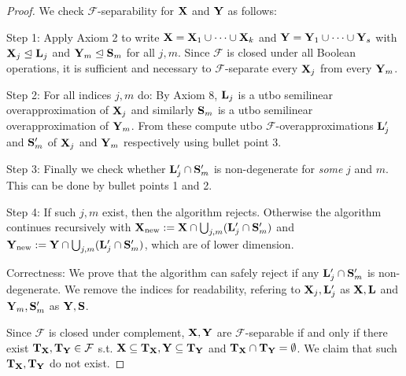 \begin{proof}
We check \(\mathcal{F}\)-separability for \(\mathbf{X}\) and \(\mathbf{Y}\) as follows:

Step 1:  Apply Axiom 2 to write \(\mathbf{X}=\mathbf{X}_1 \cup \dots \cup \mathbf{X}_k\) and \(\mathbf{Y}=\mathbf{Y}_1 \cup \dots \cup \mathbf{Y}_s\) with \(\mathbf{X}_j \trianglelefteq \mathbf{L}_j\) and \(\mathbf{Y}_m \trianglelefteq \mathbf{S}_m\) for all \(j,m\). Since \(\mathcal{F}\) is closed under all Boolean operations, it is sufficient and necessary to \(\mathcal{F}\)-separate every \(\mathbf{X}_j\) from every \(\mathbf{Y}_m\). 

Step 2: For all indices \(j,m\) do: By Axiom 8, \(\mathbf{L}_j\) is a utbo semilinear overapproximation of \(\mathbf{X}_j\) and similarly \(\mathbf{S}_m\) is a utbo semilinear overapproximation of \(\mathbf{Y}_m\). From these compute utbo \(\mathcal{F}\)-overapproximations \(\mathbf{L}_j'\) and \(\mathbf{S}_m'\) of \(\mathbf{X}_j\) and \(\mathbf{Y}_m\) respectively using bullet point 3.

Step 3: Finally we check whether \(\mathbf{L}_j' \cap \mathbf{S}_m'\) is non-degenerate for \emph{some} \(j\) and \(m\). This can be done by bullet points 1 and 2. 

Step 4: If such \(j,m\) exist, then the algorithm rejects. Otherwise the algorithm continues recursively with \(\mathbf{X}_{\text{new}}:=\mathbf{X} \cap \bigcup_{j,m} (\mathbf{L}_j' \cap \mathbf{S}_m')\) and \(\mathbf{Y}_{\text{new}}:=\mathbf{Y} \cap \bigcup_{j,m} (\mathbf{L}_j' \cap \mathbf{S}_m')\), which are of lower dimension.

Correctness: We prove that the algorithm can safely reject if any \(\mathbf{L}_j' \cap \mathbf{S}_m'\) is non-degenerate. We remove the indices for readability, refering to \(\mathbf{X}_j, \mathbf{L}_j'\) as \(\mathbf{X}, \mathbf{L}\) and \(\mathbf{Y}_m, \mathbf{S}_m'\) as \(\mathbf{Y}, \mathbf{S}\).

Since \(\mathcal{F}\) is closed under complement, \(\mathbf{X}, \mathbf{Y}\) are \(\mathcal{F}\)-separable if and only if there exist \(\mathbf{T}_{\mathbf{X}}, \mathbf{T}_{\mathbf{Y}} \in \mathcal{F}\) s.t. \(\mathbf{X} \subseteq \mathbf{T}_{\mathbf{X}}, \mathbf{Y} \subseteq \mathbf{T}_{\mathbf{Y}}\) and \(\mathbf{T}_{\mathbf{X}} \cap \mathbf{T}_{\mathbf{Y}}=\emptyset\). We claim that such \(\mathbf{T}_{\mathbf{X}}, \mathbf{T}_{\mathbf{Y}}\) do not exist.


\end{proof}
